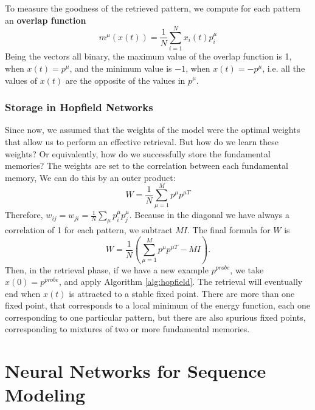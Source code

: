 \documentclass[oneside]{book}
\theoremstyle{definition}
\theoremstyle{plain}
\begin{document}
To measure the goodness of the retrieved pattern, we compute for each pattern an \textbf{overlap function}
\[
    m^{\mu}(x(t))=\frac{1}{N}\sum_{i=1}^N x_i(t)p_i^{\mu}
\]
Being the vectors all binary, the maximum value of the overlap function is 1, when $x(t)=p^\mu$, and the minimum value is $-1$, when $x(t) =-p^\mu$, i.e. all the values of $x(t)$ are the opposite of the values in $p^\mu$.
\subsection{Storage in Hopfield Networks}
Since now, we assumed that the weights of the model were the optimal weights that allow us to perform an effective retrieval. But how do we learn these weights? Or equivalently, how do we successfully store the fundamental memories?
The weights are set to the correlation between each fundamental memory, We can do this by an outer product:
\begin{equation}
    W =\frac{1}{N} \sum_{\mu=1}^M p^\mu p^{\mu T}
\end{equation}
Therefore, $w_{ij}=w_{ji} = \frac{1}{N}\sum_\mu p^{\mu}_i p_{j}^\mu$.
Because in the diagonal we have always a correlation of 1 for each pattern, we subtract $MI$. The final formula for $W$ is
\begin{equation}
     W =\frac{1}{N} \left( \sum_{\mu=1}^M p^\mu p^{\mu T} -MI \right).
\end{equation}
Then, in the retrieval phase, if we have a new example $p^{probe}$, we take $x(0)=p^{probe}$, and apply Algorithm \ref{alg:hopfield}.
The retrieval will eventually end when $x(t)$ is attracted to a stable fixed point. There are more than one fixed point, that corresponds to a local minimum of the energy function, each one corresponding to one particular pattern, but there are also spurious fixed points, corresponding to mixtures of two or more fundamental memories. 
\chapter{ Neural Networks for Sequence Modeling}
\end{document}
